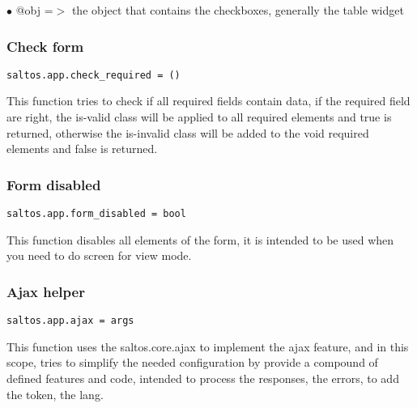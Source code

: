 \documentclass[a4paper]{article}
\begin{document}
\begin{compactitem}
\item[\color{myblue}$\bullet$] @obj =$>$ the object that contains the checkboxes, generally the table widget
\end{compactitem}

\hypertarget{toc575}{}
\subsubsection{Check form}

\begin{lstlisting}
saltos.app.check_required = ()
\end{lstlisting}

This function tries to check if all required fields contain data, if the required field are
right, the is-valid class will be applied to all required elements and true is returned,
otherwise the is-invalid class will be added to the void required elements and false is
returned.

\hypertarget{toc576}{}
\subsubsection{Form disabled}

\begin{lstlisting}
saltos.app.form_disabled = bool
\end{lstlisting}

This function disables all elements of the form, it is intended to be used when you need
to do screen for view mode.

\hypertarget{toc577}{}
\subsubsection{Ajax helper}

\begin{lstlisting}
saltos.app.ajax = args
\end{lstlisting}

This function uses the saltos.core.ajax to implement the ajax feature, and in
this scope, tries to simplify the needed configuration by provide a compound of
defined features and code, intended to process the responses, the errors, to
add the token, the lang.
\end{document}
